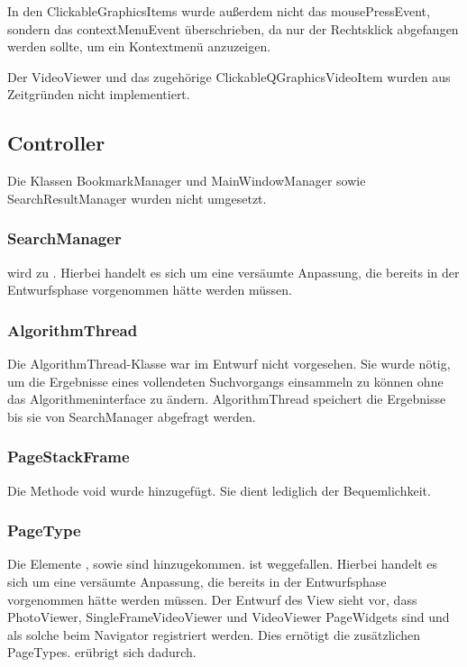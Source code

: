 In den ClickableGraphicsItems wurde außerdem nicht das mousePressEvent, sondern das contextMenuEvent überschrieben, da nur der Rechtsklick abgefangen werden sollte, um ein Kontextmenü anzuzeigen.

Der VideoViewer und das zugehörige ClickableQGraphicsVideoItem wurden aus Zeitgründen nicht implementiert.

\subsection{Controller}
Die Klassen BookmarkManager und MainWindowManager sowie SearchResultManager wurden nicht umgesetzt.

\subsubsection{SearchManager}
 wird zu . Hierbei handelt es sich um eine versäumte Anpassung, die bereits in der Entwurfsphase vorgenommen hätte werden müssen.

\subsubsection{AlgorithmThread}
Die AlgorithmThread-Klasse war im Entwurf nicht vorgesehen. Sie wurde nötig, um die Ergebnisse eines vollendeten Suchvorgangs einsammeln zu können ohne das Algorithmeninterface zu ändern. AlgorithmThread speichert die Ergebnisse bis sie von SearchManager abgefragt werden.

\subsubsection{PageStackFrame}
Die Methode void  wurde hinzugefügt. Sie dient lediglich der Bequemlichkeit.

\subsubsection{PageType}
Die Elemente ,  sowie  sind hinzugekommen.  ist weggefallen. Hierbei handelt es sich um eine versäumte Anpassung, die bereits in der Entwurfsphase vorgenommen hätte werden müssen. Der Entwurf des View sieht vor, dass PhotoViewer, SingleFrameVideoViewer und VideoViewer PageWidgets sind und als solche beim Navigator registriert werden. Dies ernötigt die zusätzlichen PageTypes.  erübrigt sich dadurch.

